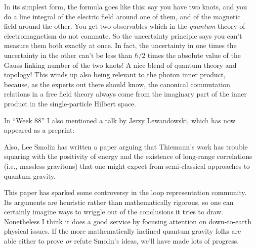 \documentclass{article}
\def\tightlist{}
\renewcommand{\texttt}[1]{%
  \begingroup
  \ttfamily
  \begingroup\lccode`~=`/\lowercase{\endgroup\def~}{/\discretionary{}{}{}}%
  \begingroup\lccode`~=`[\lowercase{\endgroup\def~}{[\discretionary{}{}{}}%
  \begingroup\lccode`~=`.\lowercase{\endgroup\def~}{.\discretionary{}{}{}}%
  \catcode`/=\active\catcode`[=\active\catcode`.=\active
  \scantokens{#1\noexpand}%
  \endgroup
}
\begin{document}
In its simplest form, the formula goes like this: say you have two
knots, and you do a line integral of the electric field around one of
them, and of the magnetic field around the other. You get two
observables which in the \emph{quantum} theory of electromagnetism do
not commute. So the uncertainty principle says you can't measure them
both exactly at once. In fact, the uncertainty in one times the
uncertainty in the other can't be less than \(\hbar/2\) times the
absolute value of the Gauss linking number of the two knots! A nice
blend of quantum theory and topology! This winds up also being relevant
to the photon inner product, because, as the experts out there should
know, the canonical commutation relations in a free field theory always
come from the imaginary part of the inner product in the single-particle
Hilbert space.

In \protect\hyperlink{week88}{``Week 88''} I also mentioned a talk by
Jerzy Lewandowski, which has now appeared as a preprint:


Also, Lee Smolin has written a paper arguing that Thiemann's work has
trouble squaring with the positivity of energy and the existence of
long-range correlations (i.e., massless gravitons) that one might expect
from semi-classical approaches to quantum gravity.


This paper has sparked some controversy in the loop representation
community. Its arguments are heuristic rather than mathematically
rigorous, so one can certainly imagine ways to wriggle out of the
conclusions it tries to draw. Nonetheless I think it does a good service
by focusing attention on down-to-earth physical issues. If the more
mathematically inclined quantum gravity folks are able either to prove
\emph{or} refute Smolin's ideas, we'll have made lots of progress.
\end{document}
